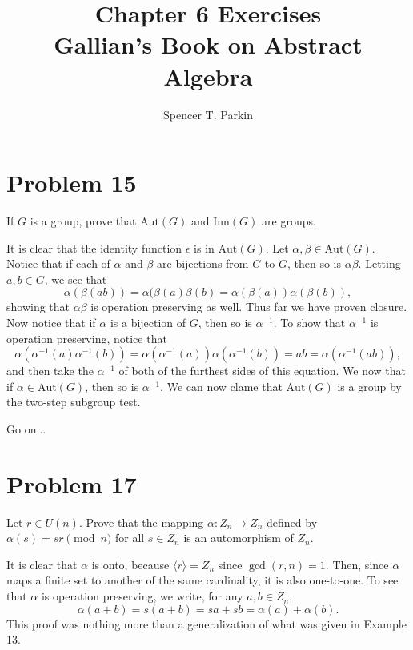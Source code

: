 \documentclass[12pt]{article}
\title{Chapter 6 Exercises\\Gallian's Book on Abstract Algebra}
\author{Spencer T. Parkin}
\newcommand{\aut}{\mbox{Aut}}
\newcommand{\inn}{\mbox{Inn}}
\begin{document}
\maketitle

\section*{Problem 15}

If $G$ is a group, prove that $\aut(G)$ and $\inn(G)$ are groups.

It is clear that the identity function $\epsilon$ is in $\aut(G)$.
Let $\alpha,\beta\in\aut(G)$.  Notice that if each of $\alpha$ and
$\beta$ are bijections from $G$ to $G$, then so is $\alpha\beta$.
Letting $a,b\in G$, we see that
\begin{equation*}
\alpha(\beta(ab))=\alpha(\beta(a)\beta(b)=\alpha(\beta(a))\alpha(\beta(b)),
\end{equation*}
showing that $\alpha\beta$ is operation preserving as well.
Thus far we have proven closure.  Now notice that if $\alpha$ is
a bijection of $G$, then so is $\alpha^{-1}$.  To show that
$\alpha^{-1}$ is operation preserving, notice that
\begin{equation*}
\alpha(\alpha^{-1}(a)\alpha^{-1}(b))=\alpha(\alpha^{-1}(a))\alpha(\alpha^{-1}(b))=ab=\alpha(\alpha^{-1}(ab)),
\end{equation*}
and then take the $\alpha^{-1}$ of both of the furthest sides of this equation.
We now that if $\alpha\in\aut(G)$, then so is $\alpha^{-1}$.  We can now
clame that $\aut(G)$ is a group by the two-step subgroup test.

Go on...

\section*{Problem 17}

Let $r\in U(n)$.  Prove that the mapping $\alpha:Z_n\to Z_n$ defined by
$\alpha(s)=sr\pmod n$ for all $s\in Z_n$ is an automorphism of $Z_n$.

It is clear that $\alpha$ is onto, because $\langle r\rangle=Z_n$ since $\gcd(r,n)=1$.
Then, since $\alpha$ maps a finite set to another of the same cardinality, it is also one-to-one.
To see that $\alpha$ is operation preserving, we write, for any $a,b\in Z_n$,
\begin{equation*}
\alpha(a+b) = s(a+b)=sa+sb=\alpha(a)+\alpha(b).
\end{equation*}
This proof was nothing more than a generalization of what was given
in Example 13.
\end{document}
